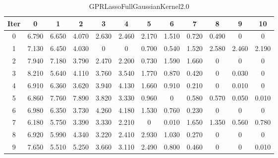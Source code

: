 \begin{table}
	\begin{center}
		\begin{tabular}{|c|c|c|c|c|c|c|c|c|c|c|c|}
			\hline
			Iter & 0 & 1 & 2 & 3 & 4 & 5 & 6 & 7 & 8 & 9 & 10 \\
			\hline
			0 & 6.790 & 6.650 & 4.070 & 2.630 & 2.460 & 2.170 & 1.510 & 0.720 & 0.490 & 0 & 0 \\
			\hline
			1 & 7.130 & 6.450 & 4.030 & 0 & 0 & 0.700 & 0.540 & 1.520 & 2.580 & 2.460 & 2.190 \\
			\hline
			2 & 7.940 & 7.180 & 3.790 & 2.470 & 2.200 & 0.730 & 1.590 & 1.660 & 0 & 0 & 0 \\
			\hline
			3 & 8.210 & 5.640 & 4.110 & 3.760 & 3.540 & 1.770 & 0.870 & 0.420 & 0 & 0.030 & 0 \\
			\hline
			4 & 6.910 & 6.360 & 3.620 & 3.940 & 4.130 & 1.660 & 0.910 & 0.210 & 0 & 0.010 & 0 \\
			\hline
			5 & 6.860 & 7.760 & 7.890 & 3.820 & 3.330 & 0.960 & 0 & 0.580 & 0.570 & 0.050 & 0.010 \\
			\hline
			6 & 6.980 & 6.350 & 3.730 & 4.260 & 4.180 & 1.530 & 0.760 & 0.230 & 0 & 0 & 0 \\
			\hline
			7 & 6.180 & 5.750 & 3.390 & 3.330 & 2.210 & 0 & 0.010 & 1.650 & 1.350 & 0.560 & 0.780 \\
			\hline
			8 & 6.920 & 5.990 & 4.340 & 3.220 & 2.410 & 2.930 & 1.030 & 0.270 & 0 & 0 & 0 \\
			\hline
			9 & 7.650 & 5.510 & 5.250 & 3.660 & 3.110 & 2.490 & 0.800 & 0.460 & 0 & 0 & 0.010 \\
			\hline
		\end{tabular}
	\end{center}
	\caption{GPRLassoFullGaussianKernel2.0}
\end{table}